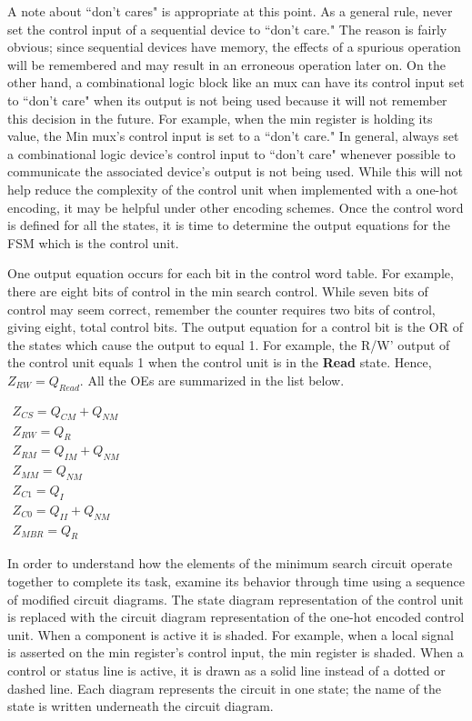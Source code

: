 A note about ``don't cares" is appropriate at this point.  As a general
rule, never set the control input of a sequential device to 
``don't care."  The reason is fairly obvious; since sequential devices 
have memory, the effects of a spurious operation will be remembered
and may result in an erroneous operation later on.  On the other hand, a
combinational logic block like an mux can have its control input set 
to ``don't care" when its output is not being used because it will not
remember this decision in the future.  For example, when the min 
register is holding its value, the Min mux's control input is set 
to a ``don't care."  In general,  always set a combinational
logic device's control input to ``don't care" whenever possible to 
communicate the associated device's output is not being used.  While
this will not help reduce the complexity of the control unit when
implemented with a one-hot encoding, it may be helpful under
other encoding schemes.  Once the control word is defined for all the
states, it is time to determine the output equations for the FSM which
is the control unit.

One output equation occurs for each bit in the control word table.
For example, there are eight bits of control in the min search control.
While seven bits of control may seem correct, remember 
the counter requires two bits of control, giving 
eight, total control bits.  The output equation for a control bit is the
OR of the states which cause the output to equal 1.  For example, the 
R/W' output of the control unit equals 1 when the control unit is in the 
{\bf Read} state. Hence, $Z_{RW} = Q_{Read}$.  
All the OEs are summarized in the list below.

$\begin{array}{l}
Z_{CS} = Q_{CM} + Q_{NM} \\
Z_{RW} = Q_{R} \\
Z_{RM} = Q_{IM}  + Q_{NM} \\
Z_{MM} = Q_{NM} \\
Z_{C1} = Q_{I} \\
Z_{C0} = Q_{II} + Q_{NM} \\
Z_{MBR} = Q_{R} 
\end{array}$


In order to understand how the elements of the minimum search circuit 
operate together to complete its task, examine its 
behavior through time using a sequence of modified circuit 
diagrams.  The state diagram representation of 
the control unit is replaced with the circuit diagram 
representation of the one-hot encoded control unit.  When a 
component is active it is shaded.  For example,
when a local signal is asserted on the min register's control
input, the min register is shaded. When a control
or status line is active, it is drawn as a solid line instead 
of a dotted or dashed line.  Each diagram represents the
circuit in one state; the name of the state is written 
underneath the circuit diagram.

